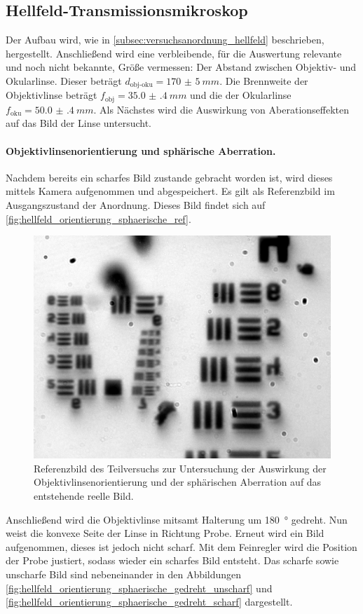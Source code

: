 \documentclass[english, ngerman]{scrartcl}
\begin{document}
\subsection{Hellfeld-Transmissionsmikroskop}
\label{subsec:durchfuehrung_hellfeld}

Der Aufbau wird, wie in \autoref{subsec:versuchsanordnung_hellfeld} beschrieben, hergestellt.
Anschließend wird eine verbleibende, für die Auswertung relevante und noch nicht bekannte, Größe vermessen: Der Abstand zwischen Objektiv- und Okularlinse. Dieser beträgt $d_{\text{obj-oku}}=\SI{170(5)}{mm}$. Die Brennweite der Objektivlinse beträgt $f_{\text{obj}}=\SI{35.0(4)}{mm}$ und die der Okularlinse $f_{\text{oku}}=\SI{50.0(4)}{mm}$.
Als Nächstes wird die Auswirkung von Aberationseffekten auf das Bild der Linse untersucht.

\paragraph{Objektivlinsenorientierung und sphärische Aberration.}
Nachdem bereits ein scharfes Bild zustande gebracht worden ist, wird dieses mittels Kamera aufgenommen und abgespeichert. Es gilt als Referenzbild im Ausgangszustand der Anordnung. Dieses Bild findet sich auf \autoref{fig:hellfeld_orientierung_sphaerische_ref}.
%
\begin{figure}[H]
    \centering
    \begin{samepage}
        \includegraphics[width=0.475\linewidth]{fig/Versuch3/hellfeld_3.1_vorher.jpg}
        \caption[Hellfeld Orientierung und sphärische Aberration]{Referenzbild des Teilversuchs zur Untersuchung der Auswirkung der Objektivlinsenorientierung und der sphärischen Aberration auf das entstehende reelle Bild.}
        \label{fig:hellfeld_orientierung_sphaerische_ref}
    \end{samepage}
\end{figure}
%
Anschließend wird die Objektivlinse mitsamt Halterung um \SI{180}{\degree} gedreht. Nun weist die konvexe Seite der Linse in Richtung Probe. Erneut wird ein Bild aufgenommen, dieses ist jedoch nicht scharf. Mit dem Feinregler wird die Position der Probe justiert, sodass wieder ein scharfes Bild entsteht. Das scharfe sowie unscharfe Bild sind nebeneinander in den Abbildungen \ref{fig:hellfeld_orientierung_sphaerische_gedreht_unscharf} und \ref{fig:hellfeld_orientierung_sphaerische_gedreht_scharf} dargestellt.
\end{document}
